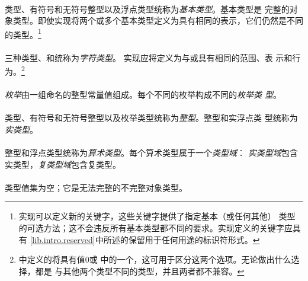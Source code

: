 \paragraph{}
类型、有符号和无符号整型以及浮点类型统称为\textit{基本类型}。基本类型是
完整的对象类型。即使实现将两个或多个基本类型定义为具有相同的表示，它们仍然是不同
的类型。\footnote{ 实现可以定义新的关键字，这些关键字提供了指定基本（或任何其他）
类型的可选方法；这不会违反所有基本类型都不同的要求。实现定义的关键字应具有
\ref{lib.intro.reserved}中所述的保留用于任何用途的标识符形式。}

\paragraph{}
三种类型、和统称为\textit{字符类型}。
实现应将定义为与或具有相同的范围、表
示和行为。\footnote{中定义的将具有值$0$或
中的一个，这可用于区分这两个选项。无论做出什么选择，都是
与其他两个类型不同的类型，并且两者都不兼容。}

\paragraph{}
\textit{枚举}由一组命名的整型常量值组成。每个不同的枚举构成不同的\textit{枚举类
型}。

\paragraph{}
类型、有符号和无符号整型以及枚举类型统称为\textit{整型}。整型和实浮点类
型统称为\textit{实类型}。

\paragraph{}
整型和浮点类型统称为\textit{算术类型}。每个算术类型属于一个\textit{类型域}：
\textit{实类型域}包含实类型，\textit{复类型域}包含复类型。

\paragraph{}
类型值集为空；它是无法完整的不完整对象类型。

